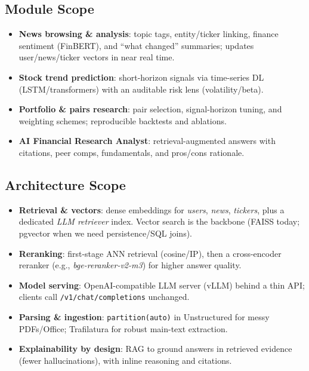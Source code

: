 \subsection{Module Scope}
\begin{itemize}
  \item \textbf{News browsing \& analysis}: topic tags, entity/ticker linking, finance sentiment (FinBERT), and “what changed” summaries; updates user/news/ticker vectors in near real time. \parencite{finbert_araci2019,finbert_trend_2024}
  \item \textbf{Stock trend prediction}: short-horizon signals via time-series DL (LSTM/transformers) with an auditable risk lens (volatility/beta).
  \item \textbf{Portfolio \& pairs research}: pair selection, signal-horizon tuning, and weighting schemes; reproducible backtests and ablations.
  \item \textbf{AI Financial Research Analyst}: retrieval-augmented answers with citations, peer comps, fundamentals, and pros/cons rationale. \parencite{rag_hallucination}
\end{itemize}

\subsection{Architecture Scope}
\begin{itemize}
  \item \textbf{Retrieval \& vectors}: dense embeddings for \emph{users}, \emph{news}, \emph{tickers}, plus a dedicated \emph{LLM retriever} index. Vector search is the backbone (FAISS today; pgvector when we need persistence/SQL joins). \parencite{faiss_2024,pgvector_github}
  \item \textbf{Reranking}: first-stage ANN retrieval (cosine/IP), then a cross-encoder reranker (e.g., \emph{bge-reranker-v2-m3}) for higher answer quality. \parencite{bge_reranker_m3}
  \item \textbf{Model serving}: OpenAI-compatible LLM server (vLLM) behind a thin API; clients call \texttt{/v1/chat/completions} unchanged. \parencite{vllm_docs}
  \item \textbf{Parsing \& ingestion}: \texttt{partition(auto)} in Unstructured for messy PDFs/Office; Trafilatura for robust main-text extraction. \parencite{unstructured_partition,trafilatura_docs}
  \item \textbf{Explainability by design}: RAG to ground answers in retrieved evidence (fewer hallucinations), with inline reasoning and citations. \parencite{rag_hallucination}
\end{itemize}

